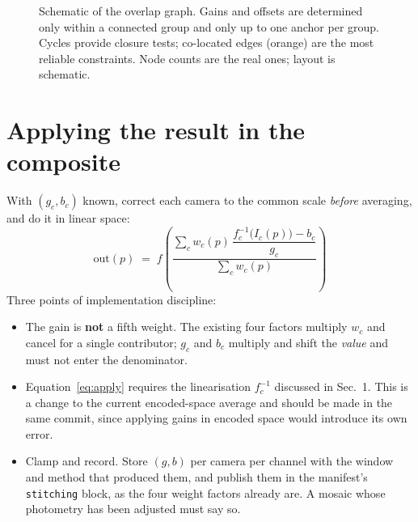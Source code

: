 \documentclass[11pt,a4paper]{article}
\newcommand{\gain}{g}
\newcommand{\off}{b}
\begin{document}
\begin{figure}[t]
\caption{Schematic of the overlap graph. Gains and offsets are determined only
within a connected group and only up to one anchor per group. Cycles provide
closure tests; co-located edges (orange) are the most reliable constraints.
Node counts are the real ones; layout is schematic.}
\label{fig:graph}
\end{figure}

\section{Applying the result in the composite}

With $(\gain_c,\off_c)$ known, correct each camera to the common scale
\emph{before} averaging, and do it in linear space:
\begin{equation}
  \boxed{\;
  \text{out}(p) \;=\; f\!\left(
    \frac{\sum_c w_c(p)\,\dfrac{f_c^{-1}\bigl(I_c(p)\bigr)-\off_c}{\gain_c}}
         {\sum_c w_c(p)}\right)\;}
  \label{eq:apply}
\end{equation}
Three points of implementation discipline:
\begin{itemize}
  \item The gain is \textbf{not} a fifth weight. The existing four factors
    multiply $w_c$ and cancel for a single contributor; $\gain_c$ and $\off_c$
    multiply and shift the \emph{value} and must not enter the denominator.
  \item Equation~\eqref{eq:apply} requires the linearisation
    $f_c^{-1}$ discussed in Sec.~1. This is a change to the current
    encoded-space average and should be made in the same commit, since applying
    gains in encoded space would introduce its own error.
  \item Clamp and record. Store $(\gain,\off)$ per camera per channel with the
    window and method that produced them, and publish them in the manifest's
    \texttt{stitching} block, as the four weight factors already are. A mosaic
    whose photometry has been adjusted must say so.
\end{itemize}
\end{document}

